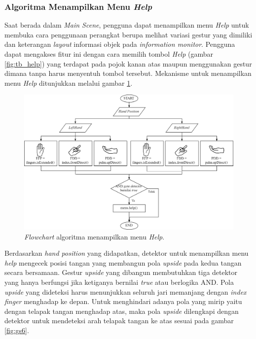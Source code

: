 		 \subsubsection{Algoritma Menampilkan Menu \textit{Help}}
		 \label{section:help}
		 \vspace{0.5ex}
		 	Saat berada dalam \textit{Main Scene}, pengguna dapat menampilkan menu \textit{Help} untuk membuka cara penggunaan perangkat berupa melihat variasi gestur yang dimiliki dan keterangan \textit{layout} informasi objek pada \textit{information monitor}. Pengguna dapat mengakses fitur ini dengan cara memilih tombol \textit{\textit{Help}} (gambar \ref{fig:tb_help}) yang terdapat pada pojok kanan atas maupun menggunakan gestur dimana tanpa harus menyentuh tombol tersebut. Mekanisme untuk menampilkan menu \textit{Help} ditunjukkan melalui gambar \ref{fig:flow_help}.  
		 	\begin{figure} [H]
		 		\includegraphics[width=\textwidth]{img/bab3/flow_help.png}
		 		\caption{\textit{Flowchart} algoritma menampilkan menu \textit{Help}.}
		 		\label{fig:flow_help}
		 	\end{figure}
	 		\vspace{-2ex}
	 	
	 		Berdasarkan \textit{hand position} yang didapatkan, detektor untuk menampilkan menu \textit{help} mengecek posisi tangan yang membangun pola \textit{upside} pada kedua tangan secara bersamaan. Gestur \textit{upside} yang dibangun membutuhkan tiga detektor yang hanya berfungsi jika ketiganya bernilai \textit{true} atau berlogika AND. Pola \textit{upside} yang dideteksi harus menunjukkan seluruh jari memanjang dengan \textit{index finger} menghadap ke depan. Untuk menghindari adanya pola yang mirip yaitu dengan telapak tangan menghadap atas, maka pola \textit{upside} dilengkapi dengan detektor untuk mendeteksi arah telapak tangan ke atas sesuai pada gambar \ref{fig:gs6}.
		 \vspace{0.75ex}
		 
